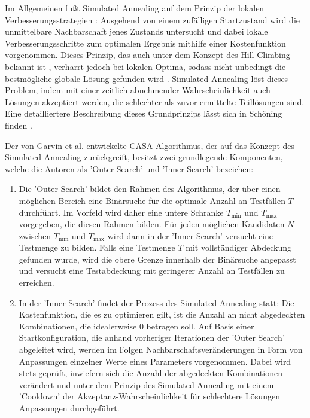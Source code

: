 Im Allgemeinen fußt Simulated Annealing auf dem Prinzip der lokalen Verbesserungsstrategien \cite[S. 330]{schoening2001algorithmik}: Ausgehend von einem zufälligen Startzustand wird die unmittelbare Nachbarschaft jenes Zustands untersucht und dabei lokale Verbesserungsschritte zum optimalen Ergebnis mithilfe einer Kostenfunktion vorgenommen. Dieses Prinzip, das auch unter dem Konzept des Hill Climbing bekannt ist \cite[S.327]{schoening2001algorithmik}, verharrt jedoch bei lokalen Optima, sodass nicht unbedingt die bestmögliche globale Lösung gefunden wird \cite[S.327]{schoening2001algorithmik}. Simulated Annealing löst dieses Problem, indem mit einer zeitlich abnehmender Wahrscheinlichkeit auch Lösungen akzeptiert werden, die schlechter als zuvor ermittelte Teillösungen sind. Eine detailliertere Beschreibung dieses Grundprinzips lässt sich in Schöning finden \cite[S.329 ff.]{schoening2001algorithmik}.

Der von Garvin et al. \cite{garvin2011evaluating} entwickelte CASA-Algorithmus, der auf das Konzept des Simulated Annealing zurückgreift, besitzt zwei grundlegende Komponenten, welche die Autoren als 'Outer Search' und 'Inner Search' bezeichen:
\begin{enumerate}
\item Die 'Outer Search' bildet den Rahmen des Algorithmus, der über einen möglichen Bereich eine Binärsuche für die optimale Anzahl an Testfällen $T$ durchführt. Im Vorfeld wird daher eine untere Schranke $T_{\min}$ und $T_{\max}$ vorgegeben, die diesen Rahmen bilden. Für jeden möglichen Kandidaten $N$ zwischen  $T_{\min}$ und $T_{\max}$ wird dann in der 'Inner Search' versucht eine Testmenge zu bilden. Falls eine Testmenge $T$ mit vollständiger Abdeckung gefunden wurde, wird die obere Grenze innerhalb der Binärsuche angepasst und versucht eine Testabdeckung mit geringerer Anzahl an Testfällen zu erreichen.
\item In der 'Inner Search' findet der Prozess des Simulated Annealing statt: Die Kostenfunktion, die es zu optimieren gilt, ist die Anzahl an nicht abgedeckten Kombinationen, die idealerweise 0 betragen soll. Auf Basis einer Startkonfiguration, die anhand vorheriger Iterationen der 'Outer Search' abgeleitet wird, werden im Folgen Nachbarschaftsveränderungen in Form von Anpassungen einzelner Werte eines Parameters vorgenommen. Dabei wird stets geprüft, inwiefern sich die Anzahl der abgedeckten Kombinationen verändert und unter dem Prinzip des Simulated Annealing mit einem 'Cooldown' der Akzeptanz-Wahrscheinlichkeit für schlechtere Lösungen Anpassungen durchgeführt.
\end{enumerate}

